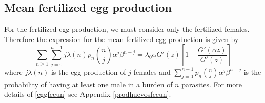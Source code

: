 \documentclass[useAMS,referee,usenatbib]{biom}
\begin{document}
\subsection{Mean fertilized egg production}
For the fertilized egg production, we must consider only the fertilized females. Therefore the expression for the mean fertilized egg production is given by
\begin{equation}\label{eggfecun}
\sum_{n\geq 1}\sum_{j=0}^{n-1}j\lambda(n)p_n\binom{n}{j}\alpha^j\beta^{n-j}=
\lambda_0 \alpha G'(z) \left[1-\frac{ G'(\alpha z)}{G'(z)}\right]  
\end{equation}
where
$j\lambda(n)$ is the egg production of $j$ females and $\sum_{j=0}^{n-1} p_n\binom{n}{j}\alpha^j\beta^{n-j}$ is the probability 
of having at least one male in a burden of $n$ parasites.
For more details of \eqref{eggfecun} see Appendix \eqref{prodhuevosfecun}.






\end{document}
